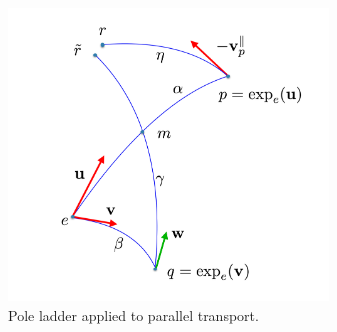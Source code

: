 \begin{figure}[htbp]
	\centering
	\includegraphics[width=8.5cm]{figures/theorem_pict.pdf}
	\caption{Pole ladder applied to parallel transport.}
	\label{fig:theorem_pict}
\end{figure}
